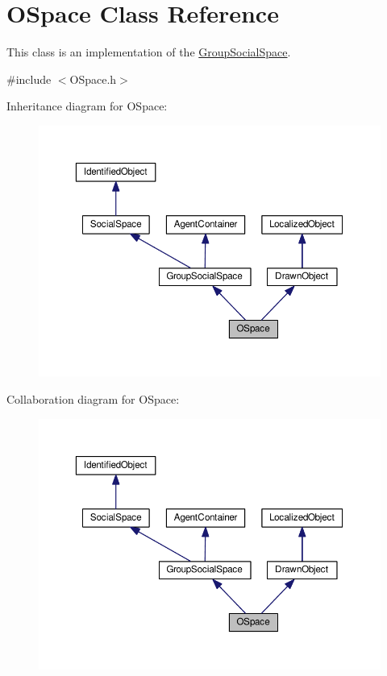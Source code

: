 \hypertarget{classOSpace}{}\section{O\+Space Class Reference}
\label{classOSpace}


This class is an implementation of the \hyperlink{classGroupSocialSpace}{Group\+Social\+Space}.  




{\ttfamily \#include $<$O\+Space.\+h$>$}



Inheritance diagram for O\+Space\+:\nopagebreak
\begin{figure}[H]
\begin{center}
\leavevmode
\includegraphics[width=350pt]{classOSpace__inherit__graph}
\end{center}
\end{figure}


Collaboration diagram for O\+Space\+:\nopagebreak
\begin{figure}[H]
\begin{center}
\leavevmode
\includegraphics[width=350pt]{classOSpace__coll__graph}
\end{center}
\end{figure}

